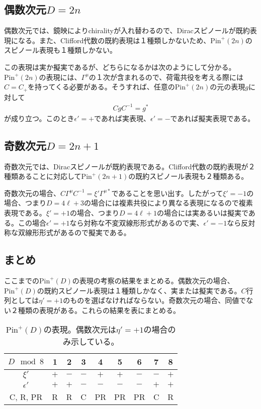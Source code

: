 \documentclass[12pt,a4paper]{jlreq}
\newcommand{\Pin}{\mathrm{Pin}^{+}}
\begin{document}
\subsection{偶数次元$D=2n$}
偶数次元では、鏡映によりchiralityが入れ替わるので、Diracスピノールが既約表現になる。また、Clifford代数の既約表現は１種類しかないため、$\Pin(2n)$のスピノール表現も１種類しかない。

この表現は実か擬実であるが、どちらになるかは次のようにして分かる。$\Pin(2n)$の表現には、$\Gamma^{\mu}$の１次が含まれるので、荷電共役を考える際には$C=C_{+}$を持ってくる必要がある。そうすれば、任意の$\Pin(2n)$の元の表現$g$に対して
\begin{align*}
  CgC^{-1}=g^*
\end{align*}
が成り立つ。このとき$\epsilon'=+$であれば実表現、$\epsilon'=-$であれば擬実表現である。

\subsection{奇数次元$D=2n+1$}
奇数次元では、Diracスピノールが既約表現である。Clifford代数の既約表現が２種類あることに対応して$\Pin(2n+1)$の既約スピノール表現も２種類ある。

奇数次元の場合、$C\Gamma^{\mu}C^{-1}=\xi' \Gamma^{\mu*}$であることを思い出す。したがって$\xi'=-1$の場合、つまり$D=4\ell+3$の場合には複素共役により異なる表現になるので複素表現である。$\xi'=+1$の場合、つまり$D=4\ell+1$の場合には実あるいは擬実である。この場合$\epsilon'=+1$なら対称な不変双線形形式があるので実、$\epsilon'=-1$なら反対称な双線形形式があるので擬実である。

\subsection{まとめ}
ここまでの$\Pin(D)$の表現の考察の結果をまとめる。偶数次元の場合、$\Pin(D)$の既約スピノール表現は１種類しかなく、実または擬実である。$C$行列としては$\eta'=+1$のものを選ばなければならない。奇数次元の場合、同値でない２種類の表現がある。これらの結果を表にまとめる。
\begin{table}[htb]
  \begin{center}
    \begin{tabular}{|c|c|c|c|c|c|c|c|c|}\hline
      $D \mod 8$ & 1 & 2 & 3 & 4 & 5 & 6 & 7 & 8\\ \hline
      $\xi'$ & $+$ & $-$ & $-$ & $+$ & $+$ & $-$ & $-$ & $+$ \\\hline
      $\epsilon'$ & $+$ & $+$ & $-$ & $-$ & $-$ & $-$ & $+$ & $+$ \\ \hline
      C, R, PR & R & R & C & PR & PR & PR & C & R \\ \hline
    \end{tabular}
  \end{center} 
  \caption{$\Pin(D)$の表現。偶数次元は$\eta'=+1$の場合のみ示している。}
  \end{table}
\end{document}
